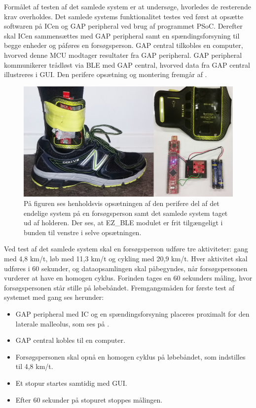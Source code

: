 Formålet af testen af det samlede system er at undersøge, hvorledes de resterende krav overholdes. Det samlede systems funktionalitet testes ved først at opsætte softwaren på ICen og GAP peripheral ved brug af programmet PSoC. Derefter skal ICen sammensættes med GAP peripheral samt en spændingsforsyning til begge enheder og påføres en forsøgsperson. GAP central tilkobles en computer, hvorved denne MCU modtager resultater fra GAP peripheral. GAP peripheral kommunikerer trådløst via BLE med GAP central, hvorved data fra GAP central illustreres i GUI. Den perifere opsætning og montering fremgår af .
\begin{figure}[H]
	\centering
	\includegraphics[scale=0.143]{figures/cDesign/samlet_system_paafod4.jpg}
	\caption{På figuren ses henholdsvis opsætningen af den perifere del af det endelige system på en forsøgsperson samt det samlede system taget ud af holderen. Der ses, at EZ\_BLE modulet er frit tilgængeligt i bunden til venstre i selve opsætningen.}
	\label{fig:samlede_system_opstilling}
\end{figure}\vspace{-.25cm}
Ved test af det samlede system skal en forsøgsperson udføre tre aktiviteter: gang med 4,8 km/t, løb med 11,3 km/t og cykling med 20,9 km/t. Hver aktivitet skal udføres i 60 sekunder, og dataopsamlingen skal påbegyndes, når forsøgspersonen vurderer at have en homogen cyklus. Forinden tages en 60 sekunders måling, hvor forsøgspersonen står stille på løbebåndet. Fremgangsmåden for første test af systemet med gang ses herunder: 
\begin{itemize}
\item GAP peripheral med IC og en spændingsforsyning placeres proximalt for den laterale malleolus, som ses på .
\item GAP central kobles til en computer.
\item Forsøgspersonen skal opnå en homogen cyklus på løbebåndet, som indstilles til 4,8 km/t. 
\item Et stopur startes samtidig med GUI.
\item Efter 60 sekunder på stopuret stoppes målingen.
\end{itemize}
